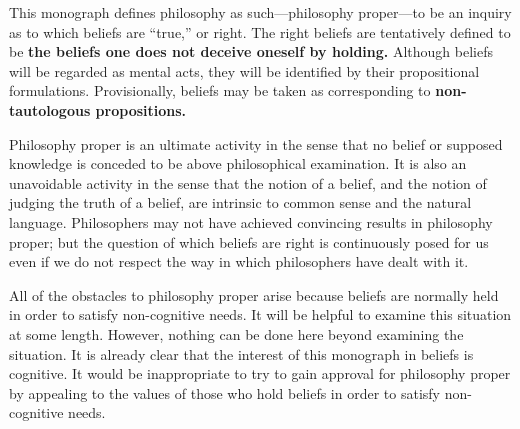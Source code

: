 









\newcommand{\stress}[1]{\textbf{#1}}

\pagestyle{salpc}
\setheadrule{.4pt}

This monograph defines philosophy as such---philosophy proper---to be 
an inquiry as to which beliefs are \enquote{true,} or right. The right beliefs are 
tentatively defined to be \stress{the beliefs one does not deceive oneself by holding.}
Although beliefs will be regarded as mental acts, they will be identified by 
their propositional formulations. Provisionally, beliefs may be taken as 
corresponding to \stress{non-tautologous propositions.}

Philosophy proper is an ultimate activity in the sense that no belief or 
supposed knowledge is conceded to be above philosophical examination. It is 
also an unavoidable activity in the sense that the notion of a belief, and the 
notion of judging the truth of a belief, are intrinsic to common sense and the 
natural language. Philosophers may not have achieved convincing results in 
philosophy proper; but the question of which beliefs are right is 
continuously posed for us even if we do not respect the way in which 
philosophers have dealt with it. 

All of the obstacles to philosophy proper arise because beliefs are 
normally held in order to satisfy non-cognitive needs. It will be helpful to 
examine this situation at some length. However, nothing can be done here 
beyond examining the situation. It is already clear that the interest of this 
monograph in beliefs is cognitive. It would be inappropriate to try to gain 
approval for philosophy proper by appealing to the values of those who hold 
beliefs in order to satisfy non-cognitive needs. 

